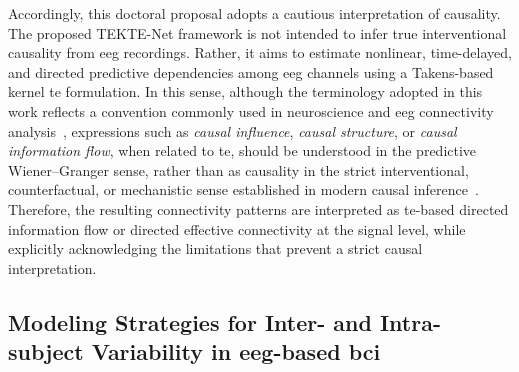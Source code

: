 Accordingly, this doctoral proposal adopts a cautious interpretation of causality. 
The proposed TEKTE-Net framework is not intended to infer true interventional 
causality from \gls{eeg} recordings. Rather, it aims to estimate nonlinear, 
time-delayed, and directed predictive dependencies among \gls{eeg} channels using 
a Takens-based kernel \gls{te} formulation. In this sense, although the terminology 
adopted in this work reflects a convention commonly used in neuroscience and 
\gls{eeg} connectivity analysis~\cite{Friston2013Connectivity,Seth2015Granger,
Vicente2011TE}, expressions such as \emph{causal influence}, \emph{causal structure}, 
or \emph{causal information flow}, when related to \gls{te}, should be understood in 
the predictive Wiener--Granger sense, rather than as causality in the strict 
interventional, counterfactual, or mechanistic sense established in modern causal 
inference~\cite{Pearl2009Causality,Peters2017Elements}. Therefore, the resulting 
connectivity patterns are interpreted as \gls{te}-based directed information flow or 
directed effective connectivity at the signal level, while explicitly acknowledging 
the limitations that prevent a strict causal interpretation.


\subsection{Modeling Strategies for Inter- and Intra-subject Variability in \gls{eeg}-based \gls{bci}}

